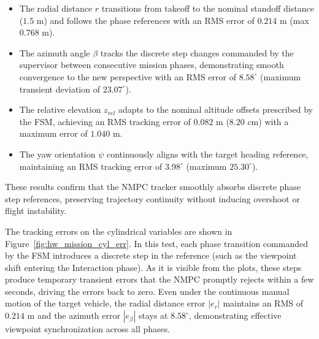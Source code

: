 \begin{itemize}
    \item The radial distance $r$ transitions from takeoff to the nominal standoff distance ($1.5\text{ m}$) and follows the phase references with an RMS error of $0.214\text{ m}$ (max $0.768\text{ m}$).
    \item The azimuth angle $\beta$ tracks the discrete step changes commanded by the supervisor between consecutive mission phases, demonstrating smooth convergence to the new perspective with an RMS error of $8.58^\circ$ (maximum transient deviation of $23.07^\circ$).
    \item The relative elevation $z_{rel}$ adapts to the nominal altitude offsets prescribed by the FSM, achieving an RMS tracking error of $0.082\text{ m}$ ($8.20\text{ cm}$) with a maximum error of $1.040\text{ m}$.
    \item The yaw orientation $\psi$ continuously aligns with the target heading reference, maintaining an RMS tracking error of $3.98^\circ$ (maximum $25.30^\circ$).
\end{itemize}
These results confirm that the NMPC tracker smoothly absorbs discrete phase step references, preserving trajectory continuity without inducing overshoot or flight instability.

The tracking errors on the cylindrical variables are shown in Figure~\ref{fig:hw_mission_cyl_err}. In this test, each phase transition commanded by the FSM introduces a discrete step in the reference (such as the viewpoint shift entering the Interaction phase). As it is visible from the plots, these steps produce temporary transient errors that the NMPC promptly rejects within a few seconds, driving the errors back to zero. Even under the continuous manual motion of the target vehicle, the radial distance error $|e_r|$ maintains an RMS of $0.214\text{ m}$ and the azimuth error $|e_\beta|$ stays at $8.58^\circ$, demonstrating effective viewpoint synchronization across all phases.

